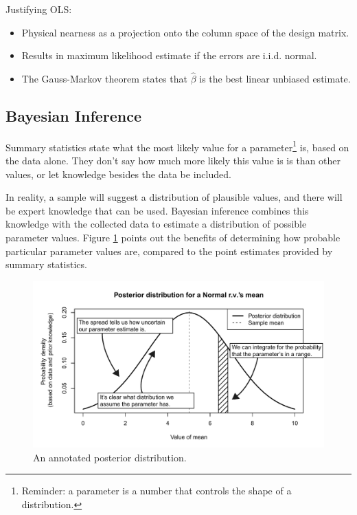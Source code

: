 \documentclass[11pt,a4paper,article]{memoir} %
\begin{document}
Justifying OLS:
\begin{itemize}
	\item Physical nearness as a projection onto the column space of the design matrix.
	\item Results in maximum likelihood estimate if the errors are i.i.d. normal.
	\item The Gauss-Markov theorem states that $\hat{\beta}$ is the best linear unbiased estimate. 
\end{itemize}

\newpage
\subsection*{Bayesian Inference}
Summary statistics state what the most likely value for a parameter\footnote{Reminder: a parameter is a number that controls the shape of a distribution.} is, based on the data alone. They don't say how much more likely this value is is than other values, or let knowledge besides the data be included.
\par
 In reality, a sample will suggest a distribution of plausible values, and there will be expert knowledge that can be used. Bayesian inference combines this knowledge with the collected data to estimate a distribution of possible parameter values. Figure \ref{fig:annotated_posterior} points out the benefits of determining how probable particular parameter values are, compared to the point estimates provided by summary statistics.
\begin{figure}[b]
\includegraphics[width=\textwidth]{annotated_posterior.pdf}
\caption{An annotated posterior distribution.}
\label{fig:annotated_posterior}
\end{figure}
\end{document}
